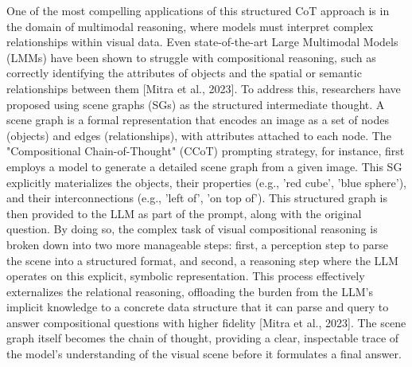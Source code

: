 \documentclass[11pt]{article}
\begin{document}
One of the most compelling applications of this structured CoT approach is in the domain of multimodal reasoning, where models must interpret complex relationships within visual data. Even state-of-the-art Large Multimodal Models (LMMs) have been shown to struggle with compositional reasoning, such as correctly identifying the attributes of objects and the spatial or semantic relationships between them [Mitra et al., 2023]. To address this, researchers have proposed using scene graphs (SGs) as the structured intermediate thought. A scene graph is a formal representation that encodes an image as a set of nodes (objects) and edges (relationships), with attributes attached to each node. The "Compositional Chain-of-Thought" (CCoT) prompting strategy, for instance, first employs a model to generate a detailed scene graph from a given image. This SG explicitly materializes the objects, their properties (e.g., 'red cube', 'blue sphere'), and their interconnections (e.g., 'left of', 'on top of'). This structured graph is then provided to the LLM as part of the prompt, along with the original question. By doing so, the complex task of visual compositional reasoning is broken down into two more manageable steps: first, a perception step to parse the scene into a structured format, and second, a reasoning step where the LLM operates on this explicit, symbolic representation. This process effectively externalizes the relational reasoning, offloading the burden from the LLM's implicit knowledge to a concrete data structure that it can parse and query to answer compositional questions with higher fidelity [Mitra et al., 2023]. The scene graph itself becomes the chain of thought, providing a clear, inspectable trace of the model's understanding of the visual scene before it formulates a final answer.
\end{document}
